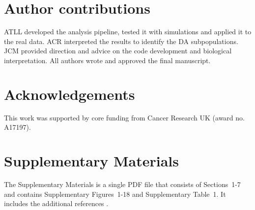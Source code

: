 \documentclass{article}
\newcommand{\suppannotate}{7}
\newcommand{\suppfigclusterreal}{18}
\begin{document}
\section{Author contributions}
ATLL developed the analysis pipeline, tested it with simulations and applied it to the real data. 
ACR interpreted the results to identify the DA subpopulations.
JCM provided direction and advice on the code development and biological interpretation.
All authors wrote and approved the final manuscript.

\section{Acknowledgements}
This work was supported by core funding from Cancer Research UK (award no. A17197).

\section{Supplementary Materials}
The Supplementary Materials is a single PDF file that consists of Sections~1-\suppannotate{} and contains Supplementary Figures~1-\suppfigclusterreal{} and Supplementary Table~1.
It includes the additional references \cite{gaudilliere2014delayed,gaudilliere2015implementing,lun2016delicious,benjamini1997multiple,robinson2010scaling,mccarthy2009treat}.



\end{document}
